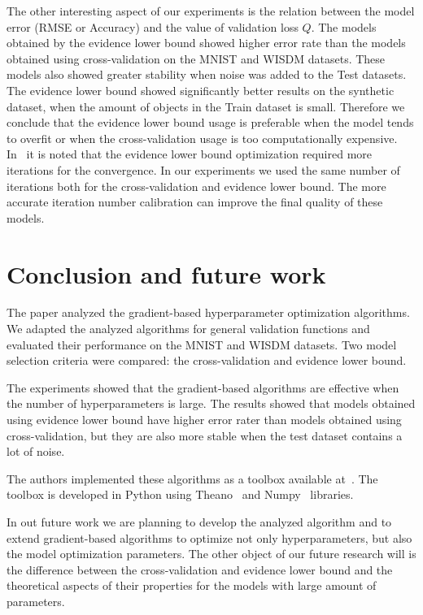 \documentclass[smallcondensed]{svjour3}
\begin{document}
The other interesting aspect of our experiments is the relation between the model error (RMSE or Accuracy) and the value of validation loss $Q$. The models obtained by the evidence lower bound showed higher error rate than the models obtained using cross-validation on the MNIST and WISDM datasets. These models also showed greater stability when noise was added to the Test datasets.  The evidence lower bound showed significantly better results on the synthetic dataset, when the amount of objects in the Train dataset is small. Therefore we conclude that the evidence lower bound usage is preferable when the model tends to overfit or when the cross-validation usage is too computationally expensive.   In~\cite{nips} it is noted that the evidence lower bound optimization required more iterations for the convergence. In our experiments we used the same number of iterations both for the cross-validation and evidence lower bound. The more accurate iteration number calibration can improve the final quality of these models. 

\section{Conclusion and future work}
\label{concl}
The paper analyzed the gradient-based hyperparameter optimization algorithms. We adapted the analyzed algorithms for general validation functions and evaluated their performance on the  MNIST and WISDM datasets. Two model selection criteria were compared: the cross-validation and evidence lower bound. 

The experiments showed that the gradient-based algorithms are effective when the number of hyperparameters is large. The results showed that models obtained using evidence lower bound have higher error rater than models obtained using cross-validation, but they are also more stable when the test dataset contains a lot of noise. 

The authors  implemented these algorithms as a toolbox available at~\cite{pyfos}. The toolbox is developed in Python using Theano~\cite{theano} and Numpy~\cite{numpy} libraries. 

In out future work we are planning to develop the analyzed algorithm and to extend gradient-based algorithms to optimize not only hyperparameters, but also the model optimization parameters. The other object of our future research will is the difference between the cross-validation and evidence lower bound and the theoretical aspects of their properties for the models with large amount of parameters.


%

\end{document}
